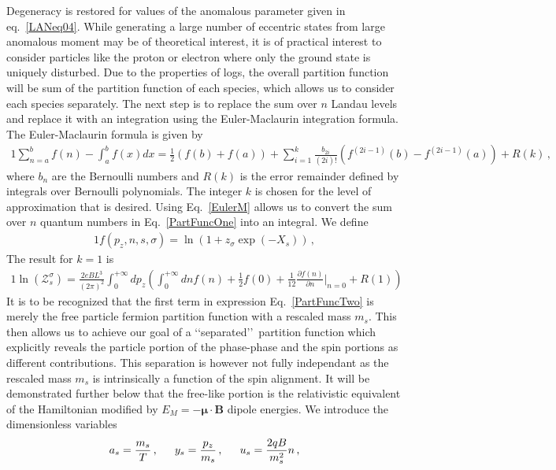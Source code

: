 \documentclass[
aps,
pra,
showpacs,
preprintnumbers,
amsmath,
amssymb,
footinbib
]{revtex4-2}
\newcommand*{\req}[1]{Eq.~{\eqref{#1}}}
\newcommand*{\bb}{\boldsymbol}
\begin{document}
Degeneracy is restored for values of the anomalous parameter given in eq.~\eqref{LANeq04}. While generating a large number of eccentric states from large anomalous moment may be of theoretical interest, it is of practical interest to consider particles like the proton or electron where only the ground state is uniquely disturbed. Due to the properties of logs, the overall partition function will be sum of the partition function of each species, which allows us to consider each species separately. The next step is to replace the sum over $n$ Landau levels and replace it with an integration using the Euler-Maclaurin integration formula. The Euler-Maclaurin formula is given by
\begin{alignat}{1}
    \label{EulerM} \sum^{b}_{n=a}f(n)-\int^{b}_{a}f(x)dx = \frac{1}{2}\left(f(b)+f(a)\right)+\sum_{i=1}^{k}\frac{b_{2i}}{(2i)!}\left(f^{(2i-1)}(b)-f^{(2i-1)}(a)\right)+R(k)\,,
\end{alignat}
where $b_{n}$ are the Bernoulli numbers and $R(k)$ is the error remainder defined by integrals over Bernoulli polynomials. The integer $k$ is chosen for the level of approximation that is desired. Using \req{EulerM} allows us to convert the sum over $n$ quantum numbers in \req{PartFuncOne} into an integral. We define
\begin{alignat}{1}
    \label{Func} f(p_{z},n,s,\sigma)=\ln\left(1+z_{\sigma}\exp(-X_{s})\right)\,,
\end{alignat}
The result for $k=1$ is
\begin{alignat}{1}
    \label{PartFuncTwo} \ln\left(\mathcal{Z}_{s}^{\sigma}\right)=\frac{2eBL^{3}}{(2\pi)^{2}}\int_{0}^{+\infty}dp_{z}\left(\int_{0}^{+\infty}dn f(n) + \frac{1}{2}f(0) + \frac{1}{12}\frac{\partial f(n)}{\partial n}\bigg\rvert_{n=0} + R(1)\right)
\end{alignat}
It is to be recognized that the first term in expression \req{PartFuncTwo} is merely the free particle fermion partition function with a rescaled mass $m_{s}$. This then allows us to achieve our goal of a \lq\lq separated\rq\rq\ partition function which explicitly reveals the particle portion of the phase-phase and the spin portions as different contributions. This separation is however not fully independant as the rescaled mass $m_{s}$ is intrinsically a function of the spin alignment. It will be demonstrated further below that the free-like portion is the relativistic equivalent of the Hamiltonian modified by $E_{M}=-\bb{\mu}\cdot\bb{B}$ dipole energies. We introduce the dimensionless variables
\begin{alignat}{1}
    \label{Unitless} a_{s}=\frac{m_{s}}{T}\,,\indent y_{s}=\frac{p_{z}}{m_{s}}\,,\indent u_{s}=\frac{2qB}{m_{s}^{2}}n\,,
\end{alignat}
\end{document}
